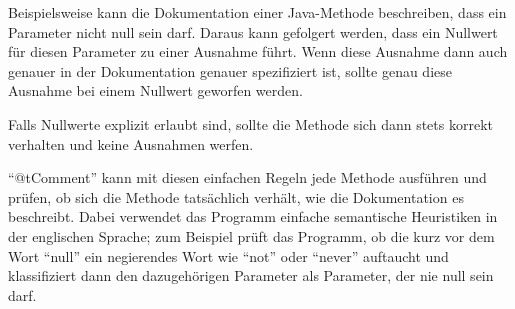 Beispielsweise kann die Dokumentation einer Java-Methode beschreiben, dass ein Parameter nicht null sein darf. Daraus kann gefolgert werden, dass ein Nullwert für diesen Parameter zu einer Ausnahme führt. Wenn diese Ausnahme dann auch genauer in der Dokumentation genauer spezifiziert ist, sollte genau diese Ausnahme bei einem Nullwert geworfen werden. 

Falls Nullwerte explizit erlaubt sind, sollte die Methode sich dann stets korrekt verhalten und keine Ausnahmen werfen. 

\enquote{@tComment} kann mit diesen einfachen Regeln jede Methode ausführen und prüfen, ob sich die Methode tatsächlich verhält, wie die Dokumentation es beschreibt. Dabei verwendet das Programm einfache  semantische Heuristiken in der englischen Sprache; zum Beispiel prüft das Programm, ob die kurz vor dem Wort \enquote{null} ein negierendes Wort wie \enquote{not} oder \enquote{never} auftaucht und klassifiziert dann den dazugehörigen Parameter als Parameter, der nie null sein darf. 
